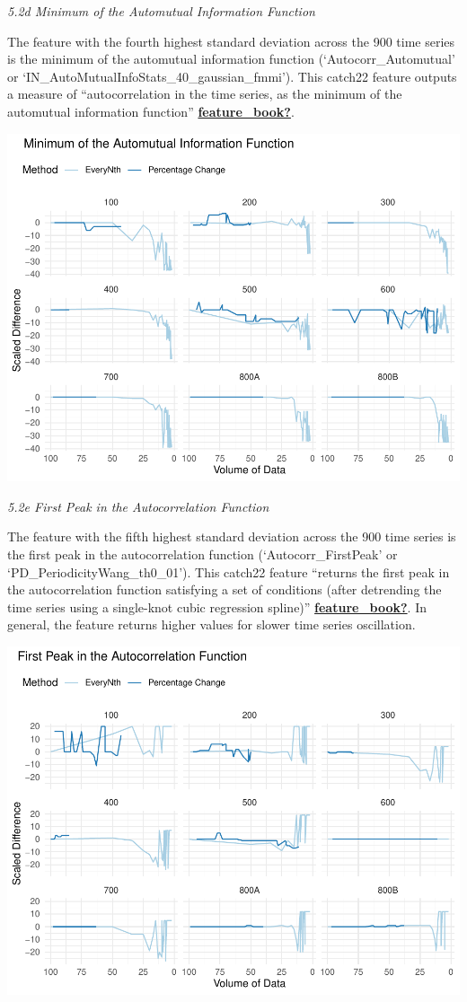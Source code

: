 \documentclass{article}
\begin{document}
\emph{5.2d Minimum of the Automutual Information Function}

The feature with the fourth highest standard deviation across the 900
time series is the minimum of the automutual information function
(`Autocorr\_Automutual' or
`IN\_AutoMutualInfoStats\_40\_gaussian\_fmmi'). This catch22 feature
outputs a measure of ``autocorrelation in the time series, as the
minimum of the automutual information function''
\protect\hyperlink{ref-feature_book}{\textbf{feature\_book?}}.

\includegraphics{210431461_CSC8639_Dissertation_files/figure-latex/AutoMutalFunction-1.pdf}

\emph{5.2e First Peak in the Autocorrelation Function}

The feature with the fifth highest standard deviation across the 900
time series is the first peak in the autocorrelation function
(`Autocorr\_FirstPeak' or `PD\_PeriodicityWang\_th0\_01'). This catch22
feature ``returns the first peak in the autocorrelation function
satisfying a set of conditions (after detrending the time series using a
single-knot cubic regression spline)''
\protect\hyperlink{ref-feature_book}{\textbf{feature\_book?}}. In
general, the feature returns higher values for slower time series
oscillation.

\includegraphics{210431461_CSC8639_Dissertation_files/figure-latex/FirstPeak-1.pdf}
\end{document}
